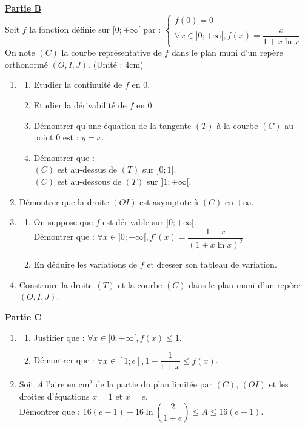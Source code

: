 \documentclass[12pt,a4paper]{article}
\begin{document}
\vspace{0.5cm}

\noindent \underline{\textbf{Partie B}} \\
Soit $f$ la fonction définie sur $[0; +\infty[$ par : 
$\begin{cases} f(0) = 0 \\ \forall x \in ]0; +\infty[, f(x) = \dfrac{x}{1 + x \ln x} \end{cases}$ \\
On note $(C)$ la courbe représentative de $f$ dans le plan muni d'un repère orthonormé $(O, I, J)$. (Unité : 4cm)
\begin{enumerate}
    \item 
    \begin{enumerate}
        \item Etudier la continuité de $f$ en 0.
        \item Etudier la dérivabilité de $f$ en 0.
        \item Démontrer qu'une équation de la tangente $(T)$ à la courbe $(C)$ au point 0 est : $y = x$.
        \item Démontrer que : \\
        $(C)$ est au-dessus de $(T)$ sur $]0; 1[$. \\
        $(C)$ est au-dessous de $(T)$ sur $]1; +\infty[$.
    \end{enumerate}
    \item Démontrer que la droite $(OI)$ est asymptote à $(C)$ en $+\infty$.
    \item 
    \begin{enumerate}
        \item On suppose que $f$ est dérivable sur $]0; +\infty[$. \\
        Démontrer que : $\forall x \in ]0; +\infty[, f'(x) = \dfrac{1 - x}{(1 + x \ln x)^2}$
        \item En déduire les variations de $f$ et dresser son tableau de variation.
    \end{enumerate}
    \item Construire la droite $(T)$ et la courbe $(C)$ dans le plan muni d'un repère $(O, I, J)$.
\end{enumerate}

\vspace{0.5cm}

\noindent \underline{\textbf{Partie C}}
\begin{enumerate}
    \item 
    \begin{enumerate}
        \item Justifier que : $\forall x \in ]0; +\infty[, f(x) \le 1$.
        \item Démontrer que : $\forall x \in [1; e], 1 - \dfrac{1}{1+x} \le f(x)$.
    \end{enumerate}
    \item Soit $A$ l'aire en cm$^2$ de la partie du plan limitée par $(C)$, $(OI)$ et les droites d'équations $x = 1$ et $x = e$. \\
    Démontrer que : $16(e - 1) + 16 \ln\left( \dfrac{2}{1+e}\right)  \le A \le 16(e - 1)$.
\end{enumerate}
\end{document}
